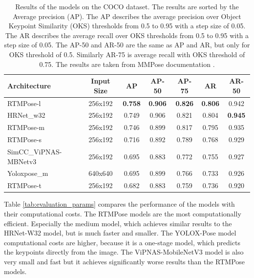 \begin{table}[htb]

    \centering
    \begin{tabular}{lcccccc}
        \toprule
        Architecture          & Input Size & AP             & AP-50          & AP-75          & AR             & AR-50          \\
        \midrule
        RTMPose-l             & 256x192    & \textbf{0.758} & \textbf{0.906} & \textbf{0.826} & \textbf{0.806} & 0.942          \\
        HRNet\_w32            & 256x192    & 0.749          & 0.906          & 0.821          & 0.804          & \textbf{0.945} \\
        RTMPose-m             & 256x192    & 0.746          & 0.899          & 0.817          & 0.795          & 0.935          \\
        RTMPose-s             & 256x192    & 0.716          & 0.892          & 0.789          & 0.768          & 0.929          \\
        SimCC\_ViPNAS-MBNetv3 & 256x192    & 0.695          & 0.883          & 0.772          & 0.755          & 0.927          \\
        Yoloxpose\_m          & 640x640    & 0.695          & 0.899          & 0.766          & 0.733          & 0.926          \\
        RTMPose-t             & 256x192    & 0.682          & 0.883          & 0.759          & 0.736          & 0.920          \\


        \bottomrule
    \end{tabular}
    \caption{Results of the models on the COCO dataset. The results are sorted by the Average precision (AP). The AP describes the average precision over Object Keypoint Similarity (OKS) thresholds from 0.5 to 0.95 with a step size of 0.05. The AR describes the average recall over OKS thresholds from 0.5 to 0.95 with a step size of 0.05. The AP-50 and AR-50 are the same as AP and AR, but only for OKS threshold of 0.5. Similarly AR-75 is average recall with OKS threshold of 0.75. The results are taken from MMPose documentation \cite{mmpose2020}.}
    \label{tab:evaluation_results_coco}

\end{table}

Table \ref{tab:evaluation_params} compares the performance of the models with their computational costs. The RTMPose models are the most computationally efficient. Especially the medium model, which achieves similar results to the HRNet-W32 model, but is much faster and smaller. The YOLOX-Pose model computational costs are higher, because it is a one-stage model, which predicts the keypoints directly from the image. The ViPNAS-MobileNetV3 model is also very small and fast but it achieves significantly worse results than the RTMPose models.




